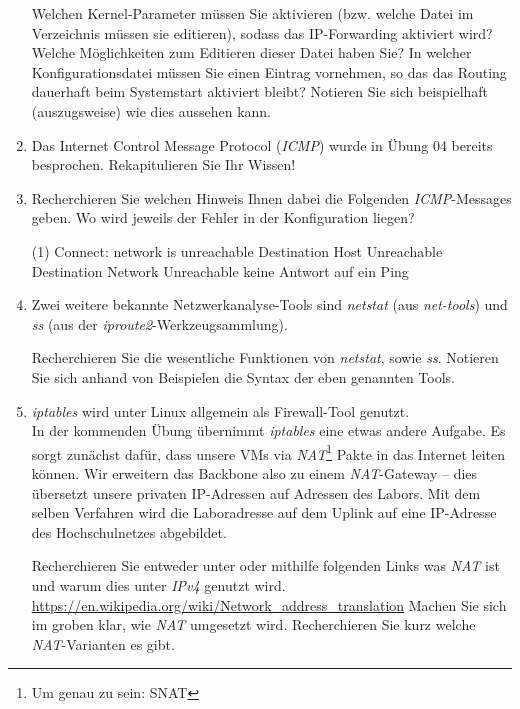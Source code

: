 \documentclass[paper=a4,fontsize=11pt]{scrartcl}%
\numberwithin{equation}{section}
\begin{document}
\begin{enumerate}
\begin{tasks}
	\task Welchen Kernel-Parameter müssen Sie aktivieren (bzw. welche Datei im  Verzeichnis müssen sie editieren), sodass das IP-Forwarding aktiviert wird? Welche Möglichkeiten zum Editieren dieser Datei haben Sie?
	\task In welcher Konfigurationsdatei müssen Sie einen Eintrag vornehmen, so das das Routing dauerhaft beim Systemstart aktiviert bleibt? Notieren Sie sich beispielhaft (auszugsweise) wie dies aussehen kann.
	\end{tasks}
	\item Das Internet Control Message Protocol (\emph{ICMP}) wurde in Übung 04 bereits besprochen. Rekapitulieren Sie Ihr Wissen!
	\item Recherchieren Sie welchen Hinweis Ihnen dabei die Folgenden \emph{ICMP}-Messages geben. Wo wird jeweils der Fehler in der Konfiguration liegen?
	\begin{tasks}(1)
		\task Connect: network is unreachable
		\task Destination Host Unreachable
		\task Destination Network Unreachable
		\task keine Antwort auf ein Ping
	\end{tasks}
	\item Zwei weitere bekannte Netzwerkanalyse-Tools sind \emph{netstat} (aus \emph{net-tools}) und \emph{ss} (aus der \emph{iproute2}-Werkzeugsammlung).
	\begin{tasks}
		\task Recherchieren Sie die wesentliche Funktionen von \emph{netstat}, sowie \emph{ss}.
		\task Notieren Sie sich anhand von Beispielen die Syntax der eben genannten Tools. 
	\end{tasks}
	\item \emph{iptables} wird unter Linux allgemein als Firewall-Tool genutzt.\\
	In der kommenden Übung übernimmt \emph{iptables} eine etwas andere Aufgabe. Es sorgt zunächst dafür, dass unsere VMs via \emph{NAT}\footnote{Um genau zu sein: SNAT} Pakte in das Internet leiten können. Wir erweitern das Backbone also zu einem \emph{NAT}-Gateway -- dies übersetzt unsere privaten IP-Adressen auf Adressen des Labors. Mit dem selben Verfahren wird die Laboradresse auf dem Uplink auf eine IP-Adresse des Hochschulnetzes abgebildet. 
	\begin{tasks}
		\task Recherchieren Sie entweder unter \cite[S. 349f]{Kurose2012} oder mithilfe folgenden Links was \emph{NAT} ist und warum dies unter \emph{IPv4} genutzt wird.\\
		\url{https://en.wikipedia.org/wiki/Network_address_translation}
		\task Machen Sie sich im groben klar, wie \emph{NAT} umgesetzt wird.
		\task Recherchieren Sie kurz welche \emph{NAT}-Varianten es gibt. 

\end{tasks}
\end{enumerate}
\end{document}
